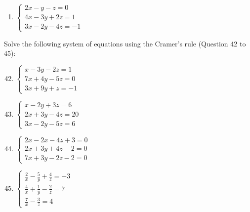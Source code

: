 \documentclass{report}
\begin{document}
\begin{multicols}{2}
\begin{enumerate}[wide, labelwidth=!, labelindent=0pt]
        \item $\begin{cases}
                      2x - y - z = 0   \\
                      4x - 3y + 2z = 1 \\
                      3x - 2y - 4z = -1
                  \end{cases}$

    \end{enumerate}

    \noindent Solve the following system of equations using the Cramer's rule (Question 42 to 45):

    \begin{enumerate}[wide, labelwidth=!, labelindent=0pt]
        \setcounter{enumi}{41}

        \item $\begin{cases}
                      x - 3y - 2z = 1  \\
                      7x + 4y - 5z = 0 \\
                      3x + 9y + z = -1
                  \end{cases}$

        \item $\begin{cases}
                      x - 2y + 3z = 6   \\
                      2x + 3y - 4z = 20 \\
                      3x - 2y - 5z = 6
                  \end{cases}$

        \item $\begin{cases}
                      2x - 2x - 4z + 3 = 0 \\
                      2x + 3y + 4z - 2 = 0 \\
                      7x + 3y - 2z - 2 = 0
                  \end{cases}$

        \item $\begin{cases}
                      \frac{2}{x} - \frac{5}{y} + \frac{4}{z} = -3 \\
                      \frac{4}{x} + \frac{1}{y} - \frac{2}{z} = 7  \\
                      \frac{7}{x} - \frac{3}{z} = 4
                  \end{cases}$

    \end{enumerate}

\end{multicols}
\end{document}
